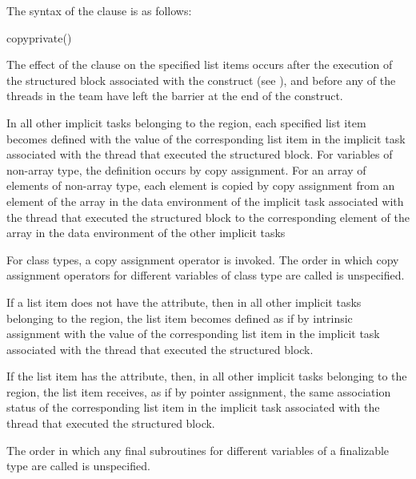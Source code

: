 \syntax
The syntax of the  clause is as follows:

\begin{ompSyntax}
copyprivate()
\end{ompSyntax}

\descr
The effect of the  clause on the specified list items occurs after the
execution of the structured block associated with the  construct (see
),
and before any of the threads in the team have left the barrier
at the end of the construct.

\begin{ccppspecific}
In all other implicit tasks belonging to the  region, each specified list item
becomes defined with the value of the corresponding list item in the implicit task associated with the
thread that executed the structured block. For variables of non-array type, the definition
occurs by copy assignment. For an array of elements of non-array type, each element is
copied by copy assignment from an element of the array in the data environment of the
implicit task associated with the thread that executed the structured block to the
corresponding element of the array in the data environment of the other implicit tasks
\end{ccppspecific}

\begin{cppspecific}
For class types, a copy assignment operator is invoked. The order in which copy
assignment operators for different variables of class type are called is unspecified.
\end{cppspecific}

\begin{fortranspecific}
If a list item does not have the  attribute, then in all other implicit tasks
belonging to the  region, the list item becomes defined as if by intrinsic
assignment with the value of the corresponding list item in the implicit task associated
with the thread that executed the structured block.

If the list item has the  attribute, then, in all other implicit tasks belonging to
the  region, the list item receives, as if by pointer assignment, the same
association status of the corresponding list item in the implicit task associated with the
thread that executed the structured block.

The order in which any final subroutines for different variables of a finalizable type are called is unspecified.
\end{fortranspecific}

